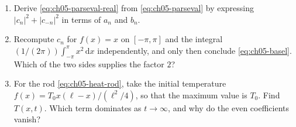 \begin{enumerate}
    \item\label{ex:fourier-parseval} Derive \eqref{eq:ch05-parseval-real} from \eqref{eq:ch05-parseval} by expressing $|c_n|^2+|c_{-n}|^2$ in terms of $a_n$ and $b_n$.

    \item\label{ex:basel-series} Recompute $c_n$ for $f(x)=x$ on $[-\pi,\pi]$ and the integral $(1/(2\pi))\int_{-\pi}^{\pi}x^2\,\mathrm{d}x$ independently, and only then conclude \eqref{eq:ch05-basel}. Which of the two sides supplies the factor $2$?

    \item\label{ex:fourier-heat} For the rod \eqref{eq:ch05-heat-rod}, take the initial temperature $f(x)=T_0 x(\ell-x)/(\ell^2/4)$, so that the maximum value is $T_0$. Find $T(x,t)$. Which term dominates as $t\to\infty$, and why do the even coefficients vanish?
\end{enumerate}
